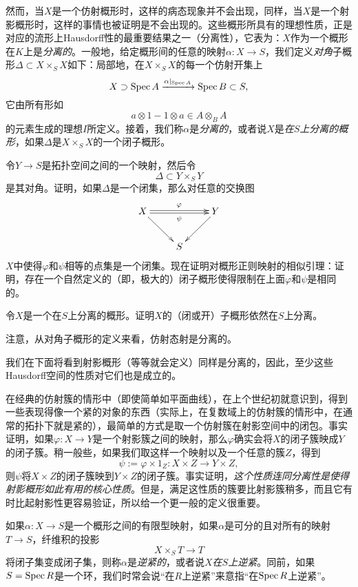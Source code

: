 然而，当$X$是一个仿射概形时，这样的病态现象并不会出现，同样，当$X$是一个射影概形时，这样的事情也被证明是不会出现的。这些概形所具有的理想性质，正是对应的流形上Hausdorff性的最重要结果之一（分离性），它表为：$X$作为一个概形在$K$上是\textit{分离的}。一般地，给定概形间的任意的映射$\alpha:X\to S$，我们定义\textit{对角}子概形$\Delta\subset X\times_S X$如下：局部地，在$X\times_S X$的每一个仿射开集上
\[
	X\supset \operatorname{Spec} A\xrightarrow{\alpha|_{\operatorname{Spec} A}}\operatorname{Spec} B\subset S,
\]
它由所有形如
\[
a\otimes 1 - 1\otimes a \in A\otimes_B A
\]
的元素生成的理想$I$所定义。接着，我们称$\alpha$是\textit{分离的}，或者说$X$是\textit{在$S$上分离的概形}，如果$\Delta$是$X\times_S X$的一个闭子概形。

\begin{exe}
令$Y\to S$是拓扑空间之间的一个映射，然后令
\[
	\Delta \subset Y\times_S Y
\]
是其对角。证明，如果$\Delta$是一个闭集，那么对任意的交换图
\[
	\xymatrix{
		X\ar@<0.3ex>[rr]^\varphi \ar@<-0.3ex>[rr]_\psi\ar[dr] &&Y\ar[ld]\\
		&S&
	}
\]
$X$中使得$\varphi$和$\psi$相等的点集是一个闭集。现在证明对概形正则映射的相似引理：证明，存在一个自然定义的（即，极大的）闭子概形使得限制在上面$\varphi$和$\psi$是相同的。
\end{exe}

\begin{exe}
	令$X$是一个在$S$上分离的概形。证明$X$的（闭或开）子概形依然在$S$上分离。
\end{exe}

\begin{exe}
	注意，从对角子概形的定义来看，仿射态射是分离的。
\end{exe}

我们在下面将看到射影概形（等等就会定义）同样是分离的，因此，至少这些Hausdorff空间的性质对它们也是成立的。

在经典的仿射簇的情形中（即使简单如平面曲线），在上个世纪初就意识到，得到一些表现得像一个紧的对象的东西（实际上，在复数域上的仿射簇的情形中，在通常的拓扑下就是紧的），最简单的方式是取一个仿射簇在射影空间中的闭包。事实证明，如果$\varphi:X\to Y$是一个射影簇之间的映射，那么$\varphi$确实会将$X$的闭子簇映成$Y$的闭子簇。稍一般些，如果我们取这样一个映射以及一个任意的簇$Z$，得到
\[
	\psi:=\varphi\times 1_Z:X\times Z\to Y\times Z,
\]
则$\psi$将$X\times Z$的闭子簇映到$Y\times Z$的闭子簇。事实证明，\textit{这个性质连同分离性是使得射影概形如此有用的核心性质}。但是，满足这性质的簇要比射影簇稍多，而且它有时比起射影性更容易验证，所以给一个更一般的定义很重要。

如果$\alpha:X\to S$是一个概形之间的有限型映射，如果$\alpha$是可分的且对所有的映射$T\to S$，纤维积的投影
\[
	X\times_S T\to T
\]
将闭子集变成闭子集，则称$\alpha$是\textit{逆紧的}，或者说$X$\textit{在$S$上逆紧}。同前，如果$S=\operatorname{Spec} R$是一个环，我们时常会说“在$R$上逆紧”来意指“在$\operatorname{Spec} R$上逆紧”。

